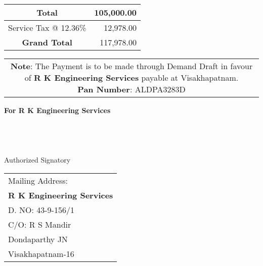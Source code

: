 \documentclass[11pt]{article}
\begin{document}
\vspace*{10pt}

\hspace*{11.8cm}
\begin{tabular}{|c|r|}
\hline
Total & 105,000.00 \\
\hline
Service Tax @ 12.36\% & 12,978.00 \\
\hline
{\bf Grand Total} & 117,978.00 \\
\hline
\end{tabular}

\vspace*{-1.2cm}
\noindent\begin{tabular}{c}
\parbox{4in}{ {\bf Note}: The Payment is to be made through Demand Draft in favour of {\bf R K Engineering Services} payable at Visakhapatnam. \\
{\noindent \bf Pan Number}:  ALDPA3283D }\\
\end{tabular}
\vspace*{100pt}


{\bf For  R K Engineering Services } \\ \\ \\ \\ \\
 \hspace*{0.6cm}Authorized Signatory
\vspace*{-71pt}
\begin{flushright}
\begin{tabular}{l}
Mailing Address:\\
{\bf R K Engineering Services}\\
D. NO: 43-9-156/1\\
C/O: R S Mandir\\
Dondaparthy JN\\ 
Visakhapatnam-16\\
\end{tabular}
\end{flushright}
\end{document}
